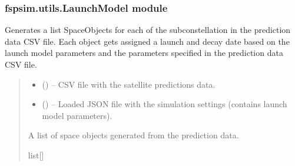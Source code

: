 \documentclass[letterpaper,10pt,english]{sphinxmanual}
\begin{document}
\subsubsection{fspsim.utils.LaunchModel module}
\label{\detokenize{fspsim.utils:module-fspsim.utils.LaunchModel}}\label{\detokenize{fspsim.utils:fspsim-utils-launchmodel-module}}

\begin{fulllineitems}
\label{\detokenize{fspsim.utils:fspsim.utils.LaunchModel.Prediction2SpaceObjects}}
\pysigstartsignatures
{}
\pysigstopsignatures
\sphinxAtStartPar
Generates a list SpaceObjects for each of the sub\sphinxhyphen{}constellation in the prediction data CSV file.
Each object gets assigned a launch and decay date based on the launch model parameters and the parameters
specified in the prediction data CSV file.
\begin{quote}\begin{description}
\begin{itemize}
\item {} 
\sphinxAtStartPar
{} () – CSV file with the satellite predictions data.

\item {} 
\sphinxAtStartPar
{} () – Loaded JSON file with the simulation settings (contains launch model parameters).

\end{itemize}

\sphinxAtStartPar
A list of space objects generated from the prediction data.

\sphinxAtStartPar
list{[}{\hyperref[\detokenize{fspsim.utils:fspsim.utils.SpaceObject.SpaceObject}]{}}{]}

\end{description}\end{quote}

\end{fulllineitems}
\end{document}
